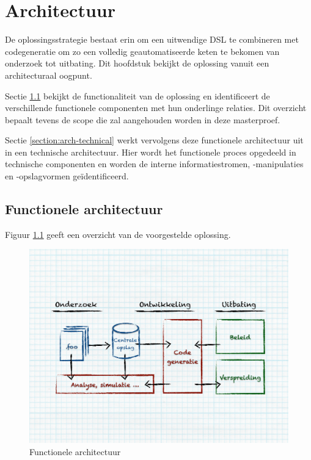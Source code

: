 
\chapter{Architectuur}
\label{chapter:architectuur}

De oplossingsstrategie bestaat erin om een uitwendige DSL te combineren met
codegeneratie om zo een volledig geautomatiseerde keten te bekomen van
onderzoek tot uitbating. Dit hoofdstuk bekijkt de oplossing vanuit een
architecturaal oogpunt.

Sectie \ref{section:arch-functional} bekijkt de functionaliteit van de
oplossing en identificeert de verschillende functionele componenten met hun
onderlinge relaties. Dit overzicht bepaalt tevens de scope die zal aangehouden
worden in deze masterproef.

Sectie \ref{section:arch-technical} werkt vervolgens deze functionele
architectuur uit in een technische architectuur. Hier wordt het functionele
proces opgedeeld in technische componenten en worden de interne
informatiestromen, -manipulaties en \mbox{-opslagvormen} ge\"identificeerd.

\section{Functionele architectuur}
\label{section:arch-functional}

Figuur \ref{fig:arch-functional} geeft een overzicht van de voorgestelde
oplossing.

\begin{figure}[ht]
  \centering
  \includegraphics[width=0.9\linewidth]{resources/arch-functional.pdf}
  \caption{Functionele architectuur}
  \label{fig:arch-functional}
\end{figure}

